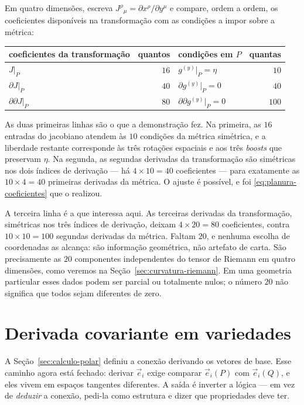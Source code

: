 \documentclass[12pt,a4paper,oneside]{book}
\theoremstyle{rgplain}
\theoremstyle{rgremark}
\begin{document}
Em quatro dimensões, escreva
$J^\rho{}_{\mu}=\partial x^\rho/\partial y^\mu$ e compare, ordem a ordem, os
coeficientes disponíveis na transformação com as condições a impor sobre a
métrica:
\begin{center}
\small
\begin{tabular}{lrlr}
\toprule
\textbf{coeficientes da transformação} & \textbf{quantos}
  & \textbf{condições em $P$} & \textbf{quantas}\\
\midrule
$J|_P$ & $16$ & $g^{(y)}|_P=\eta$ & $10$\\
$\partial J|_P$ & $40$ & $\partial g^{(y)}|_P=0$ & $40$\\
$\partial\partial J|_P$ & $80$ & $\partial\partial g^{(y)}|_P=0$ & $100$\\
\bottomrule
\end{tabular}
\end{center}

As duas primeiras linhas são o que a demonstração fez. Na primeira, as $16$
entradas do jacobiano atendem às $10$ condições da métrica simétrica, e a
liberdade restante corresponde às três rotações espaciais e aos três
\emph{boosts} que preservam $\eta$. Na segunda, as segundas derivadas da
transformação são simétricas nos dois índices de derivação --- há
$4\times10=40$ coeficientes --- para exatamente as $10\times4=40$ primeiras
derivadas da métrica. O ajuste é possível, e foi \eqref{eq:planura-coeficientes}
que o realizou.

A terceira linha é a que interessa aqui. As terceiras derivadas da
transformação, simétricas nos três índices de derivação, deixam
$4\times20=80$ coeficientes, contra $10\times10=100$ segundas derivadas da
métrica. Faltam $20$, e nenhuma escolha de coordenadas as alcança: são
informação geométrica, não artefato de carta. São precisamente as $20$
componentes independentes do tensor de Riemann em quatro dimensões, como
veremos na Seção~\ref{sec:curvatura-riemann}. Em uma geometria particular
esses dados podem ser parcial ou totalmente nulos; o número $20$ não
significa que todos sejam diferentes de zero.

\section{Derivada covariante em variedades}
\label{sec:derivada-covariante-variedade}
\label{sec:compatibilidade-metrica}

A Seção~\ref{sec:calculo-polar} definiu a conexão derivando os vetores de
base. Esse caminho agora está fechado: derivar $\vec e_i$ exige comparar
$\vec e_i(P)$ com $\vec e_i(Q)$, e eles vivem em espaços tangentes diferentes.
A saída é inverter a lógica --- em vez de \emph{deduzir} a conexão, pedi-la
como estrutura e dizer que propriedades deve ter.
\end{document}
